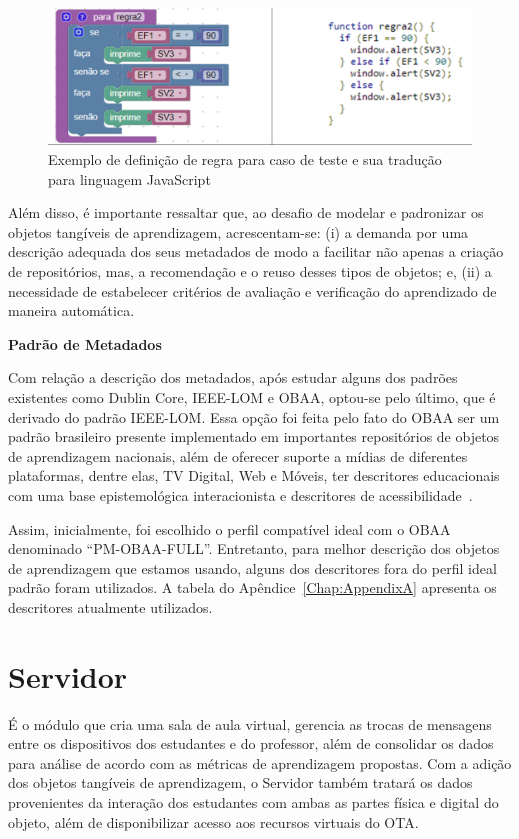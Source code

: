\begin{figure}[ht]
	\centering
	\includegraphics[width=1\linewidth]{chapters/proposedMethod/Blockly.png}
	\caption{Exemplo de definição de regra para caso de teste e sua tradução para linguagem JavaScript}
	\label{fig:blockly_exemplo}
\end{figure}


Além disso, é importante ressaltar que, ao desafio de modelar e padronizar os objetos tangíveis de aprendizagem, acrescentam-se: (i) a demanda por uma descrição adequada dos seus metadados de modo a facilitar não apenas a criação de repositórios, mas, a recomendação e o reuso desses tipos de objetos; e, (ii) a necessidade de estabelecer critérios de avaliação e verificação do aprendizado de maneira automática.

\textbf{Padrão de Metadados}

Com relação a descrição dos metadados, após estudar alguns dos padrões existentes como Dublin Core, IEEE-LOM e OBAA, optou-se pelo último, que é derivado do padrão IEEE-LOM. Essa opção foi feita pelo fato do OBAA ser um padrão brasileiro presente implementado em importantes repositórios de objetos de aprendizagem nacionais, além de oferecer suporte a mídias de diferentes plataformas, dentre elas, TV Digital, Web e Móveis, ter descritores educacionais com uma base epistemológica interacionista e descritores de acessibilidade~\citep{vicari:2009}.

Assim, inicialmente, foi escolhido o perfil compatível ideal com o OBAA denominado ``PM-OBAA-FULL''. Entretanto, para melhor descrição dos objetos de aprendizagem que estamos usando, alguns dos descritores fora do perfil ideal padrão foram utilizados. A tabela do Apêndice~\ref{Chap:AppendixA} apresenta os descritores atualmente utilizados. 


\section{Servidor}\label{section:service}
É o módulo que cria uma sala de aula virtual, gerencia as trocas de mensagens entre os dispositivos dos estudantes e do professor, além de consolidar os dados para análise de acordo com as métricas de aprendizagem propostas. Com a adição dos objetos tangíveis de aprendizagem, o Servidor também tratará os dados provenientes da interação dos estudantes com ambas as partes física e digital do objeto, além de disponibilizar acesso aos recursos virtuais do OTA.

